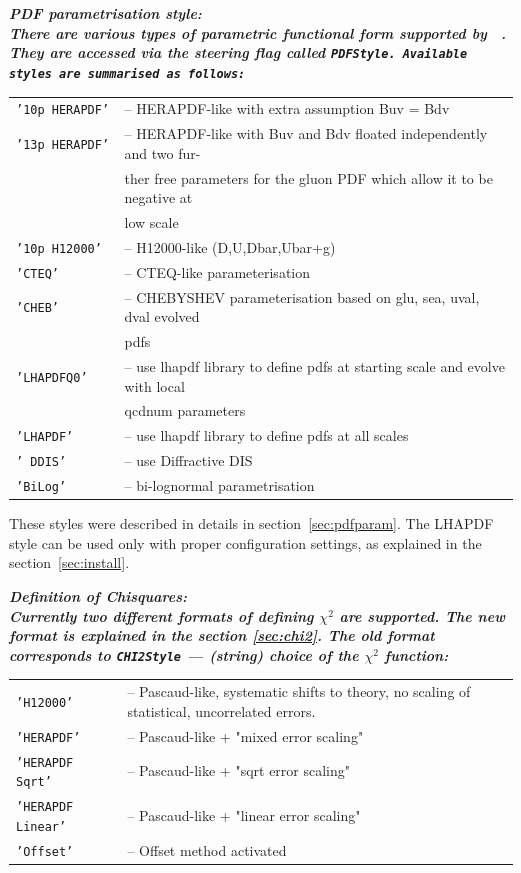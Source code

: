 \begin{description}
\begin{description}
\item \it\bf PDF parametrisation style: \rm\\
There are various types of parametric functional form supported by \fitter\ .
They are accessed via the steering flag called \tt{PDFStyle}\rm. Available styles
are summarised as follows:

\begin{tabular}{ll}
 \tt  '10p HERAPDF'   & -- HERAPDF-like with extra assumption Buv = Bdv \\
 \tt   '13p HERAPDF' & -- HERAPDF-like with Buv and Bdv floated independently and two fur-\\
                     &  ther free parameters for the gluon PDF which allow it to be negative at \\
                     &  low scale\\
 \tt   '10p H12000'  & -- H12000-like (D,U,Dbar,Ubar+g) \\
 \tt   'CTEQ'        & -- CTEQ-like parameterisation \\
 \tt   'CHEB'        & -- CHEBYSHEV parameterisation based on glu, sea, uval, dval evolved\\
                     &  pdfs \\
 \tt  'LHAPDFQ0'    & -- use lhapdf library to define pdfs at starting scale and evolve with local \\
                    &  qcdnum parameters \\
 \tt  'LHAPDF'      & -- use lhapdf library to define pdfs at all scales\\
 \tt   ' DDIS'        & -- use Diffractive DIS \\
 \tt  'BiLog'       & -- bi-lognormal parametrisation \\
\end{tabular}


These styles were described in details in section~\ref{sec:pdfparam}.
The LHAPDF style can be used only with proper configuration settings,
 as explained in the section~\ref{sec:install}.
\item \it\bf  Definition of Chisquares:\rm\\
Currently two different formats of defining $\chi^2$ are supported.
The new format is explained in the section \ref{sec:chi2}.
The old format corresponds to {\tt CHI2Style}  --- (string) choice of the $\chi^2$ function:\\
\begin{tabular}{ll}
    {\tt 'H12000'}& -- Pascaud-like, systematic shifts to theory, no scaling of statistical, uncorrelated errors.\\
    {\tt 'HERAPDF'}& -- Pascaud-like + "mixed error scaling"\\
    {\tt 'HERAPDF Sqrt'}&   -- Pascaud-like + "sqrt error scaling"\\
    {\tt 'HERAPDF Linear'}& -- Pascaud-like + "linear error scaling"\\
    {\tt 'Offset'}& -- Offset method activated\\
 \end{tabular}


\end{description}
\end{description}
